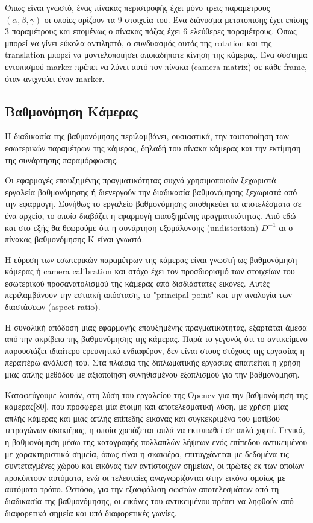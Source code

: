 Όπως είναι γνωστό, ένας πίνακας περιστροφής έχει μόνο τρεις παραμέτρους $(\alpha, \beta, \gamma)$ οι οποίες ορίζουν τα 9 στοιχεία του. Ένα διάνυσμα μετατόπισης έχει επίσης 3 παραμέτρους και επομένως ο πίνακας πόζας έχει 6 ελεύθερες παραμέτρους. Όπως μπορεί να γίνει εύκολα αντιληπτό, ο συνδυασμός αυτός της rotation και της translation μπορεί να μοντελοποιήσει οποιαδήποτε κίνηση της κάμερας. Ένα σύστημα εντοπισμού marker πρέπει να λύνει αυτό τον πίνακα (camera matrix) σε κάθε frame, όταν ανιχνεύει έναν marker.






\subsection{Βαθμονόμηση Κάμερας}


Η διαδικασία της βαθμονόμησης περιλαμβάνει, ουσιαστικά, την ταυτοποίηση των εσωτερικών παραμέτρων της κάμερας, δηλαδή του πίνακα κάμερας και την εκτίμηση της συνάρτησης παραμόρφωσης.


Οι εφαρμογές επαυξημένης πραγματικότητας συχνά χρησιμοποιούν ξεχωριστά εργαλεία βαθμονόμησης ή διενεργούν την διαδικασία βαθμονόμησης ξεχωριστά από την εφαρμογή. Συνήθως το εργαλείο βαθμονόμησης αποθηκεύει τα αποτελέσματα σε ένα αρχείο, το οποίο διαβάζει η εφαρμογή επαυξημένης πραγματικότητας. Από εδώ και στο εξής θα θεωρούμε ότι η συνάρτηση εξομάλυνσης (undistortion) $D^{-1}$ αι ο πίνακας βαθμονόμησης Κ είναι γνωστά. 


Η εύρεση των εσωτερικών παραμέτρων της κάμερας είναι γνωστή ως βαθμονόμηση κάμερας ή camera calibration και στόχο έχει τον προσδιορισμό των στοιχείων του εσωτερικού προσανατολισμού της κάμερας από δισδιάστατες εικόνες. Αυτές περιλαμβάνουν την εστιακή απόσταση, το "principal point" και την αναλογία των διαστάσεων (aspect ratio). 

Η συνολική απόδοση μιας εφαρμογής επαυξημένης πραγματικότητας, εξαρτάται άμεσα από την ακρίβεια της βαθμονόμησης της κάμερας. Παρά το γεγονός ότι το αντικείμενο παρουσιάζει ιδιαίτερο ερευνητικό ενδιαφέρον, δεν είναι στους στόχους της εργασίας η περαιτέρω ανάλυσή του. Στα πλαίσια της διπλωματικής εργασίας απαιτείται η χρήση μιας απλής μεθόδου με αξιοποίηση συνηθισμένου εξοπλισμού για την βαθμονόμηση. 


Καταφεύγουμε λοιπόν, στη λύση του εργαλείου της Opencv για την βαθμονόμηση της κάμερας[80], που προσφέρει μία έτοιμη και αποτελεσματική λύση, με χρήση μίας απλής κάμερας και μιας απλής επίπεδης εικόνας και συγκεκριμένα του μοτίβου τετραγώνων σκακιέρας, η οποία χρειάζεται απλά να εκτυπωθεί σε απλό χαρτί. 
Γενικά, η βαθμονόμηση μέσω της καταγραφής πολλαπλών λήψεων ενός επίπεδου αντικειμένου με χαρακτηριστικά σημεία, όπως είναι η σκακιέρα, επιτυγχάνεται με δεδομένα τις συντεταγμένες χώρου και εικόνας των αντίστοιχων σημείων, οι πρώτες εκ των οποίων προκύπτουν αυτόματα, ενώ οι τελευταίες αναγνωρίζονται στην εικόνα ομοίως με αυτόματο τρόπο. Ωστόσο, για την εξασφάλιση σωστών αποτελεσμάτων από τη διαδικασία της βαθμονόμησης, οι εικόνες του αντικειμένου πρέπει να ληφθούν από διαφορετικά σημεία και υπό διαφορετικές γωνίες. 





